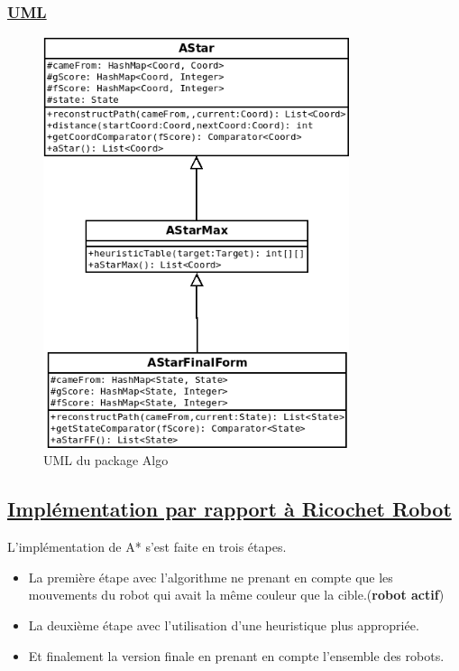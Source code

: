 \documentclass[12pt]{article}
\begin{document}
	\subsubsection{\underline{UML}}
	\begin{figure}[ht!]
		\centering
		\includegraphics[width = 0.8\textwidth]{Images/algo.png}
		\caption{UML du package Algo}
		\label{eq1}
	\end{figure}

	\subsection{\underline{Implémentation par rapport à Ricochet Robot}}
	L'implémentation de A* s'est faite en trois étapes.
	\begin{itemize}
		\item La première étape avec l'algorithme ne prenant en compte que les mouvements du robot
		qui avait la même couleur que la cible.(\textbf{robot actif})
		\item La deuxième étape avec l'utilisation d'une heuristique plus appropriée.
		\item Et finalement la version finale en prenant en compte l'ensemble des robots. 
	\end{itemize}  
\end{document}
